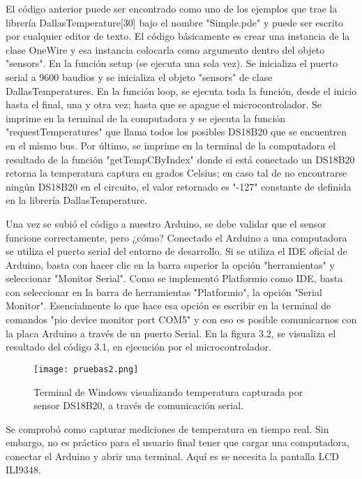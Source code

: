 \par \noindent
El código anterior puede ser encontrado como uno de los ejemplos que trae la librería DallasTemperature[30] bajo el nombre "Simple.pde" y puede ser escrito por cualquier editor de texto. El código básicamente es crear una instancia de la clase OneWire y esa instancia colocarla como argumento dentro del objeto "sensors". En la función setup (se ejecuta una sola vez). Se inicializa el puerto serial a 9600 baudios y se inicializa el objeto "sensors" de clase DallasTemperatures. En la función loop, se ejecuta toda la función, desde el inicio hasta el final, una y otra vez; hasta que se apague el microcontrolador. Se imprime en la terminal de la computadora y se ejecuta la función "requestTemperatures" que llama todos los posibles DS18B20 que se encuentren en el mismo bus. Por último, se imprime en la terminal de la computadora el resultado de la función "getTempCByIndex" donde si está conectado un DS18B20 retorna la temperatura captura en grados Celsius; en caso tal de no encontrarse ningún DS18B20 en el circuito, el valor retornado es "-127" constante de definida en la librería DallasTemperature.

\par \noindent
Una vez se subió el código a nuestro Arduino, se debe validar que el sensor funcione correctamente, pero ¿cómo? Conectado el Arduino a una computadora se utiliza el puerto serial del entorno de desarrollo. Si se utiliza el IDE oficial de Arduino, basta con hacer clic en la barra superior la opción "herramientas" y seleccionar "Monitor Serial". Como se implementó Platformio como IDE, basta con seleccionar en la barra de herramientas "Platformio", la opción "Serial Monitor". Esencialmente lo que hace esa opción es escribir en la terminal de comandos "pio device monitor port COM5" y con eso es posible comunicarnos con la placa Arduino a través de un puerto Serial. En la figura 3.2, se visualiza el resultado del código 3.1, en ejecución por el microcontrolador.

\begin{figure}[H]
	\centering
	\texttt{[image: pruebas2.png]}
	\caption{Terminal de Windows visualizando temperatura capturada por sensor DS18B20, a través de comunicación serial.}
\end{figure}

\par \noindent
Se comprobó como capturar mediciones de temperatura en tiempo real. Sin embargo, no es práctico para el usuario final tener que cargar una computadora, conectar el Arduino y abrir una terminal. Aquí es se necesita la pantalla LCD ILI9348.

